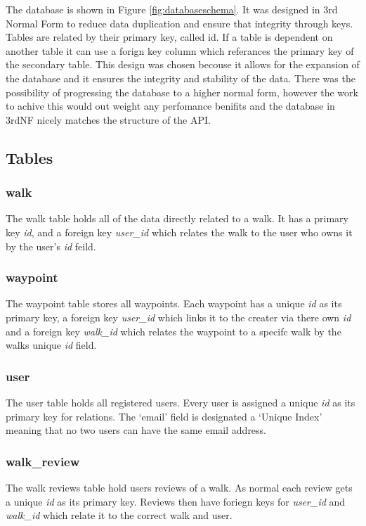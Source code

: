 \documentclass[11pt,a4paper]{report}
\begin{document}
The database is shown in Figure \ref{fig:databaseschema}. It was designed in 3rd Normal Form to reduce data duplication and ensure that integrity through keys. Tables are related by their primary key, called id. If a table is dependent on another table it can use a forign key column which referances the primary key of the secondary table. This design was chosen becouse it allows for the expansion of the database and it ensures the integrity and stability of the data. There was the possibility of progressing the database to a higher normal form, however the work to achive this would out weight any perfomance benifits and the database in 3rdNF nicely matches the structure of the API.

\subsection{Tables}

\subsubsection{walk}
The walk table holds all of the data directly related to a walk. It has a primary key \textit{id}, and a foreign key \textit{user\_id} which relates the walk to the user who owns it by the user's \textit{id} feild. 

\subsubsection{waypoint}
The waypoint table stores all waypoints. Each waypoint has a unique \textit{id} as its primary key, a foreign key \textit{user\_id} which links it to the creater via there own \textit{id} and a foreign key \textit{walk\_id} which relates the waypoint to a specifc walk by the walks unique \textit{id} field. 

\subsubsection{user}
The user table holds all registered users. Every user is assigned a unique \textit{id} as its primary key for relations. The `email' field is designated a `Unique Index' meaning that no two users can have the same email address. 

\subsubsection{walk\_review}
The walk reviews table hold users reviews of a walk. As normal each review gets a unique \textit{id} as its primary key. Reviews then have foriegn keys for \textit{user\_id} and \textit{walk\_id} which relate it to the correct walk and user. 
\end{document}
